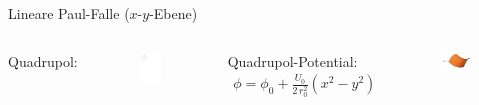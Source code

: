 \documentclass[12pt]{beamer}
\begin{document}
\begin{frame}{Lineare Paul-Falle ($x$-$y$-Ebene)}
	\begin{columns}[t]
		Quadrupol:
		\begin{figure}[h]
			\centering
			\includegraphics[width=0.8\textwidth]{./figures/lineare_paulfalle_xy_statisch.pdf}
		\end{figure}
		
		Quadrupol-Potential:
		\begin{align}
		\phi = \phi_0 + \frac{U_0}{2 \, r_0^2} (x^2-y^2)
		\end{align}
		\begin{figure}[h]
			\centering
			\includegraphics[width=0.95\textwidth]{./figures/sattelpotential.pdf}
		\end{figure}
	\end{columns}
\end{frame}
\end{document}
